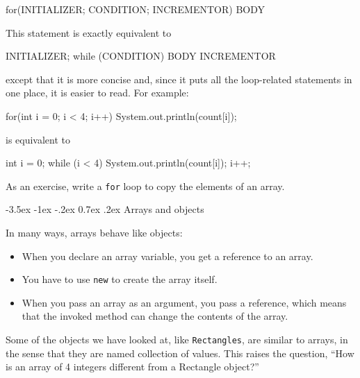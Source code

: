 \documentclass{book}
\makeatletter
\renewcommand{\section}{\@startsection 
    {section} {1} {0mm}%
    {-3.5ex \@plus -1ex \@minus -.2ex}%
    {0.7ex \@plus.2ex}%
    {\normalfont\Large\bfseries}}
\makeatother
\begin{document}
\begin{verbatimtab}
    for(INITIALIZER; CONDITION; INCREMENTOR) {
      BODY
    }
\end{verbatimtab}
%
This statement is exactly equivalent to

\begin{verbatimtab}
    INITIALIZER;
    while (CONDITION) {
      BODY
      INCREMENTOR
    }
\end{verbatimtab}
%
except that it is more concise and, since it puts all the
loop-related statements in one place, it is easier to read.
For example:

\begin{verbatimtab}
    for(int i = 0; i < 4; i++) {
      System.out.println(count[i]);
    }
\end{verbatimtab}
%
is equivalent to 

\begin{verbatimtab}
    int i = 0;
    while (i < 4) {
      System.out.println(count[i]);
      i++;
    }
\end{verbatimtab}
%
As an exercise, write a {\tt for} loop to copy the elements
of an array.

\section{Arrays and objects}

In many ways, arrays behave like objects:

\begin{itemize}

\item When you declare an array variable, you get a reference
to an array.

\item You have to use {\tt new} to create the array
itself.

\item When you pass an array as an argument, you pass a reference,
which means that the invoked method can change the contents
of the array.

\end{itemize}

Some of the objects we have looked at, like {\tt Rectangles}, are
similar to arrays, in the sense that they are named collection of
values.  This raises the question, ``How is an array of 4 integers
different from a Rectangle object?''

\end{document}
